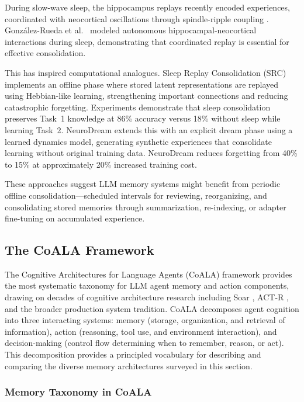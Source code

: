 \documentclass[11pt,letterpaper]{article}
\begin{document}
During slow-wave sleep, the hippocampus replays recently encoded experiences, coordinated with neocortical oscillations through spindle-ripple coupling \cite{diekelmann2010memory, carr2011hippocampal, foster2017replay}. Gonz{\'a}lez-Rueda et al.\ \cite{gonzalez2022model} modeled autonomous hippocampal-neocortical interactions during sleep, demonstrating that coordinated replay is essential for effective consolidation.

This has inspired computational analogues. Sleep Replay Consolidation (SRC) implements an offline phase where stored latent representations are replayed using Hebbian-like learning, strengthening important connections and reducing catastrophic forgetting. Experiments demonstrate that sleep consolidation preserves Task~1 knowledge at 86\% accuracy versus 18\% without sleep while learning Task~2. NeuroDream \cite{tutuncuoglu2024neurodream} extends this with an explicit dream phase using a learned dynamics model, generating synthetic experiences that consolidate learning without original training data. NeuroDream reduces forgetting from 40\% to 15\% at approximately 20\% increased training cost.

These approaches suggest LLM memory systems might benefit from periodic offline consolidation---scheduled intervals for reviewing, reorganizing, and consolidating stored memories through summarization, re-indexing, or adapter fine-tuning on accumulated experience.

\subsection{The CoALA Framework}

The Cognitive Architectures for Language Agents (CoALA) framework \cite{sumers2024cognitive} provides the most systematic taxonomy for LLM agent memory and action components, drawing on decades of cognitive architecture research including Soar \cite{laird2012soar}, ACT-R \cite{anderson2004integrated}, and the broader production system tradition. CoALA decomposes agent cognition into three interacting systems: memory (storage, organization, and retrieval of information), action (reasoning, tool use, and environment interaction), and decision-making (control flow determining when to remember, reason, or act). This decomposition provides a principled vocabulary for describing and comparing the diverse memory architectures surveyed in this section.

\subsubsection{Memory Taxonomy in CoALA}
\end{document}

